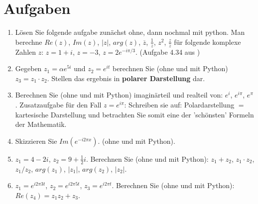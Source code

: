 \section{Aufgaben}
\begin{enumerate}
\item Lösen Sie folgende aufgabe zunächst ohne, dann nochmal mit python. Man berechne $Re(z)$, $Im(z)$, $|z|$, $arg(z)$, $\overline{z}$, $\frac{1}{z}$, $z^2$, $\frac{z}{\overline{z}}$ für folgende komplexe Zahlen $z$: $z=1+i$, $z=-3$, $z=2e^{-i\pi/3}$. (Aufgabe 4.34 aus \cite{merziger2024repetitorium})

\item Gegeben $z_1 = \alpha e^{5i}$ und $z_2 = e^{it}$ berechnen Sie (ohne und mit Python) $z_3 = z_1 \cdot z_2$. Stellen das ergebnis in \textbf{polarer Darstellung} dar. 

\item Berechnen Sie (ohne und mit Python) imaginärteil und realteil von: $e^i$, $e^{i\pi}$, $e^{\pi}$. Zusatzaufgabe für den Fall $z=e^{i\pi}$: Schreiben sie auf: Polardarstellung $=$ kartesische Darstellung und betrachten Sie somit eine der 'schönsten' Formeln der Mathematik.

\item Skizzieren Sie $Im(e^{-i 2\pi x})$. (ohne und mit Python).

\item $z_1 = 4-2i$, $z_2 = 9+\frac{1}{2}i$. Berechnen Sie (ohne und mit Python): $z_1 + z_2$, $z_1 \cdot z_2$, $z_1 / z_2$, $arg(z_1)$, $|z_1|$, $arg(z_2)$, $|z_2|$.

\item $z_1 = e^{ i 2\pi 3 t}$, $z_2 = e^{ i 2\pi 5 t}$, $z_3 = e^{ i 2\pi t}$. Berechnen Sie (ohne und mit Python): $Re(z_4) = z_1 z_2 + z_3$.



\end{enumerate}


